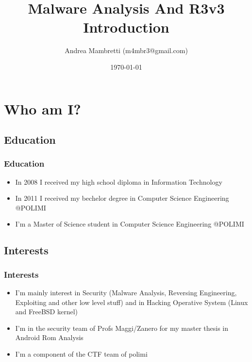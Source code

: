 \documentclass[]{beamer}
\title{Malware Analysis And R3v3 Introduction}    %
\author{Andrea Mambretti (m4mbr3@gmail.com)}        %
\institute{Politecnico di Milano}      %
\date{\today}                    %
\begin{document}
\begin{frame}
  \titlepage
\end{frame}

\section[Outline]{}

\begin{frame}
  \tableofcontents
\end{frame}

\section {Who am I?}
	\subsection {Education}
		\begin{frame}
			\frametitle{Education}
			\begin{itemize}
				\item { In 2008 I received my high school diploma in Information Technology} 
				\item { In 2011 I received my bechelor degree in Computer Science Engineering @POLIMI}
				\item { I'm a Master of Science student in Computer Science Engineering @POLIMI}
			\end{itemize}
		\end{frame}
	\subsection {Interests}
		\begin{frame}
			\frametitle{Interests}
			\begin{itemize}
				\item { I'm mainly interest in Security (Malware Analysis, Reversing Engineering, Exploiting and other low level stuff) and in Hacking Operative System (Linux and FreeBSD kernel)}
				\item { I'm in the security team of Profs Maggi/Zanero for my master thesis in Android Rom Analysis }
				\item { I'm a component of the CTF team of polimi}  
			\end{itemize}
		\end{frame}
\end{document}
